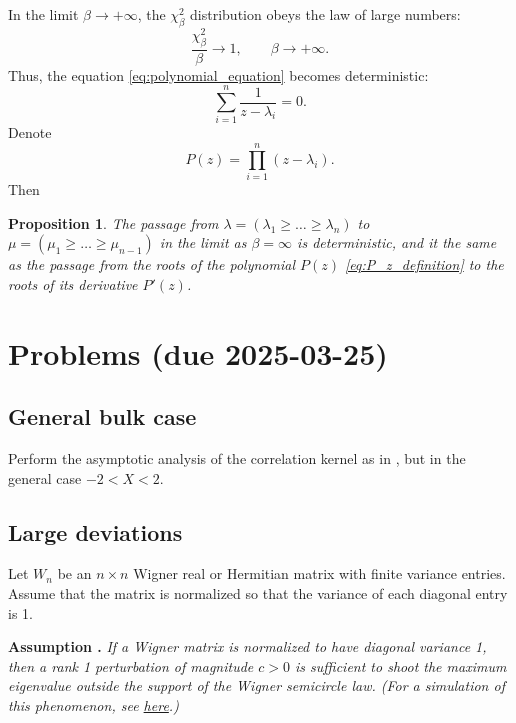 \documentclass[letterpaper,11pt,oneside,reqno]{article}
\numberwithin{equation}{section}
\newtheorem{proposition}{Proposition}[section]
\theoremstyle{definition}
\begin{document}
In the limit $\beta\to+\infty$, the $\chi^2_\beta$ distribution
obeys the law of large numbers:
\begin{equation*}
	\frac{\chi^2_\beta}{\beta}\to 1,\qquad \beta\to+\infty.
\end{equation*}
Thus, the equation \eqref{eq:polynomial_equation} becomes
deterministic:
\begin{equation*}
	\sum_{i=1}^n \frac{1}{z-\lambda_i}=0.
\end{equation*}
Denote 
\begin{equation}
	\label{eq:P_z_definition}
	P(z)=\prod_{i=1}^n(z-\lambda_i).
\end{equation}
Then 
\begin{proposition}
	The passage from $\lambda=(\lambda_1\ge \ldots \ge \lambda_n )$
	to $\mu=(\mu_1\ge \ldots \ge \mu_{n-1} )$ in the limit as $\beta=\infty$
	is deterministic, and it the same as the passage from the 
	roots of the polynomial $P(z)$ \eqref{eq:P_z_definition} to the roots of its derivative $P'(z)$.
\end{proposition}








\appendix
\setcounter{section}{6}

\section{Problems (due 2025-03-25)}

\subsection{General bulk case}
\label{prob:imaginary-critical-points}

Perform the asymptotic analysis of the correlation
kernel as in ,
but in the general case $-2<X<2$.


\subsection{Large deviations}
\label{prob:large-deviation}

Let \(W_n\) be an \(n\times n\) Wigner real or Hermitian matrix with finite variance entries. Assume that the matrix is normalized so that the variance of each diagonal entry is 1.

\medskip

\textbf{Assumption \cite{BBP2005phase}.} \textit{If a Wigner matrix is normalized to have diagonal variance 1, then a rank 1 perturbation of magnitude $c>0$ is sufficient to shoot the maximum eigenvalue outside the support of the Wigner semicircle law. (For a simulation of this phenomenon, see \href{https://lpetrov.cc/simulations/2025-01-28-bbp-transition/}{here}.)}
\end{document}

